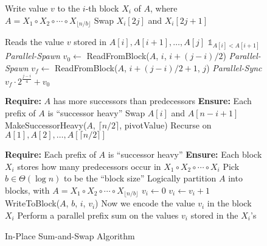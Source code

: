 \documentclass[11pt]{article}
\theoremstyle{remark}
\theoremstyle{remark}
\begin{document}
\begin{figure*}
  \scriptsize
  \caption{In-Place Sum-and-Swap Algorithm}
	\label{alg:parallelPartition_prefixsumbased_main}
  \begin{algorithmic} %
     \Comment Write value $v$ to the $i$-th block $X_i$ of $A$, where $A = X_1 \circ X_2 \circ \cdots \circ X_{\lfloor n/b \rfloor}$
          \State Swap $X_i[2j]$ and $X_i[2j+1]$
        \EndIf
      \EndFor
    \EndProcedure
    \State

     \Comment Reads the value $v$ stored in $A[i], A[i+1], \ldots, A[j]$
        \State \Return $\mathds{1}_{A[i] < A[i+1]}$
      \Else
        \State \emph{Parallel-Spawn} $v_0 \gets $ ReadFromBlock($A$, $i$, $i+(j-i)/2$)
        \State \emph{Parallel-Spawn} $v_f \gets $ ReadFromBlock($A$, $i+(j-i)/2+1$, $j$)
        \State \emph{Parallel-Sync}
        \State \Return $v_f\cdot 2^\frac{j-i}{4} + v_0$
      \EndIf
    \EndProcedure
    \State

    \State \textbf{Require: } $A$ has more successors than predecessors
    \State \textbf{Ensure: }  Each prefix of $A$ is ``successor heavy''
          \State Swap $A[i]$ and $A[n-i+1]$
        \EndIf
      \EndFor
      \State MakeSuccessorHeavy($A$, $\lceil n/2 \rceil$, pivotValue)
      \Comment Recurse on $A[1],A[2], \ldots, A[\lceil n/2 \rceil]$
    \EndProcedure
    \State


    \State \textbf{Require: } Each prefix of $A$ is ``successor heavy''
    \State \textbf{Ensure: }  Each block $X_i$ stores how many predecessors occur in $X_1 \circ X_2 \circ \cdots \circ X_i$
      \State Pick $b \in \Theta(\log n)$ to be the ``block size''
      \State Logically partition $A$ into blocks, with $A = X_1 \circ X_2 \circ \cdots \circ X_{\lfloor n/b \rfloor}$
        \State $v_i \gets 0$  
            \State $v_i \gets v_i + 1$
          \EndIf
        \EndFor
        \State WriteToBlock($A$, $b$, $i$, $v_i$)
        \Comment Now we encode the value $v_i$ in the block $X_i$
      \EndFor
      \State Perform a parallel prefix sum on the values $v_i$ stored in the $X_i$'s
   \EndProcedure
    \State


\end{algorithmic}
\end{figure*}
\end{document}
